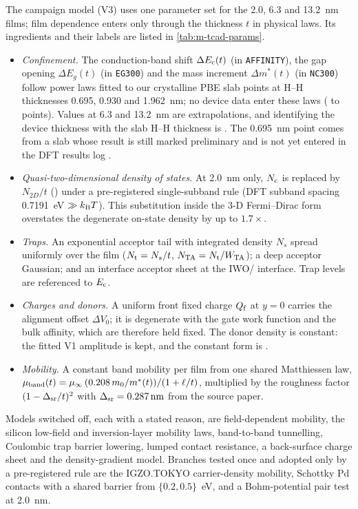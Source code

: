 The campaign model (V3) uses one parameter set for the 2.0, 6.3 and \SI{13.2}{nm} films; film dependence enters only
through the thickness $t$ in physical laws. %
Its ingredients and their labels are listed in \cref{tab:m-tcad-params}.
\begin{itemize}
\item \emph{Confinement.} The conduction-band shift $\Delta E_{\mathrm{c}}(t)$ (in \texttt{AFFINITY}), the gap opening
$\Delta E_g(t)$ (in \texttt{EG300}) and the mass increment $\Delta m^*(t)$ (in \texttt{NC300}) follow power laws fitted
to our crystalline PBE slab points at H--H thicknesses 0.695, 0.930 and \SI{1.962}{nm}; no device data enter these
laws ( to  points). %
Values at 6.3 and \SI{13.2}{nm} are extrapolations, and identifying the device thickness with the slab H--H thickness
is . %
The \SI{0.695}{nm} point comes from a slab whose result is still marked preliminary and is not yet entered in the DFT
results log . %
\item \emph{Quasi-two-dimensional density of states.} At \SI{2.0}{nm} only, $N_{\mathrm{c}}$ is replaced by $N_{2D}/t$
() under a pre-registered single-subband rule (DFT subband spacing \SI{0.7191}{eV} $\gg k_{\mathrm{B}}T$). This
substitution inside the 3-D Fermi--Dirac form overstates the degenerate on-state density by up to $1.7\times$. %
\item \emph{Traps.} An exponential acceptor tail with integrated density $N_s$ spread uniformly over the film
($N_{\mathrm{t}} = N_s/t$, $N_{\mathrm{TA}} = N_{\mathrm{t}}/W_{\mathrm{TA}}$); a deep acceptor Gaussian; and an interface acceptor sheet at the IWO/\AlO{}
interface. Trap levels are referenced to $E_{\mathrm{c}}$. %
\item \emph{Charges and donors.} A uniform front fixed charge $Q_{\mathrm{f}}$ at $y = 0$ carries the alignment offset
$\Delta V_0$; it is degenerate with the gate work function and the bulk affinity, which are therefore held fixed.
The donor density is constant: the fitted V1 amplitude is kept, and the constant form is . %
\item \emph{Mobility.} A constant band mobility per film from one shared Matthiessen law,
$\mu_{\mathrm{band}}(t) = \mu_\infty\,(0.208\,m_0/m^{*}(t))/(1+\ell/t)$, multiplied by the roughness factor $(1-\Delta_{\mathrm{sr}}/t)^2$ with
$\Delta_{\mathrm{sr}} = \SI{0.287}{nm}$ from the source paper. %
\end{itemize}
Models switched off, each with a stated reason, are field-dependent mobility, the silicon low-field and inversion-layer
mobility laws, band-to-band tunnelling, Coulombic trap barrier lowering, lumped contact resistance, a back-surface
charge sheet and the density-gradient model. %
Branches tested once and adopted only by a pre-registered rule are the IGZO.TOKYO carrier-density mobility, Schottky
Pd contacts with a shared barrier from $\{0.2, 0.5\}$~eV, and a Bohm-potential pair test at \SI{2.0}{nm}. %

